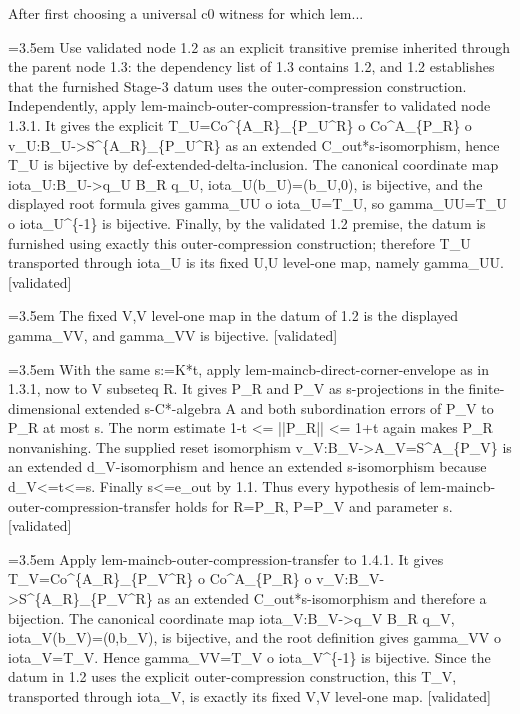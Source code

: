 \documentclass{article}
\newcommand{\step}[1]{\par\noindent\hangindent=3.5em\hangafter=1%
  \makebox[3.5em][l]{\textbf{#1.}}}
\newcommand{\steptag}[1]{\hfill{\small\textsf{[#1]}}}
\begin{document}
\begin{proofbox}{After first choosing a universal c0 witness for which lem...}
\step{1.3.2} Use validated node 1.2 as an explicit transitive premise inherited through the parent node 1.3: the dependency list of 1.3 contains 1.2, and 1.2 establishes that the furnished Stage-3 datum uses the outer-compression construction. Independently, apply lem-maincb-outer-compression-transfer to validated node 1.3.1. It gives the explicit T\_U=Co\textasciicircum{}\{A\_R\}\_\{P\_U\textasciicircum{}R\} o Co\textasciicircum{}A\_\{P\_R\} o v\_U:B\_U->S\textasciicircum{}\{A\_R\}\_\{P\_U\textasciicircum{}R\} as an extended C\_out*s-isomorphism, hence T\_U is bijective by def-extended-delta-inclusion. The canonical coordinate map iota\_U:B\_U->q\_U B\_R q\_U, iota\_U(b\_U)=(b\_U,0), is bijective, and the displayed root formula gives gamma\_UU o iota\_U=T\_U, so gamma\_UU=T\_U o iota\_U\textasciicircum{}\{-1\} is bijective. Finally, by the validated 1.2 premise, the datum is furnished using exactly this outer-compression construction; therefore T\_U transported through iota\_U is its fixed U,U level-one map, namely gamma\_UU. \steptag{validated} \\[4pt]
\step{1.4} The fixed V,V level-one map in the datum of 1.2 is the displayed gamma\_VV, and gamma\_VV is bijective. \steptag{validated} \\[6pt]
\step{1.4.1} With the same s:=K*t, apply lem-maincb-direct-corner-envelope as in 1.3.1, now to V subseteq R. It gives P\_R and P\_V as s-projections in the finite-dimensional extended s-C*-algebra A and both subordination errors of P\_V to P\_R at most s. The norm estimate 1-t <= ||P\_R|| <= 1+t again makes P\_R nonvanishing. The supplied reset isomorphism v\_V:B\_V->A\_V=S\textasciicircum{}A\_\{P\_V\} is an extended d\_V-isomorphism and hence an extended s-isomorphism because d\_V<=t<=s. Finally s<=e\_out by 1.1. Thus every hypothesis of lem-maincb-outer-compression-transfer holds for R=P\_R, P=P\_V and parameter s. \steptag{validated} \\[4pt]
\step{1.4.2} Apply lem-maincb-outer-compression-transfer to 1.4.1. It gives T\_V=Co\textasciicircum{}\{A\_R\}\_\{P\_V\textasciicircum{}R\} o Co\textasciicircum{}A\_\{P\_R\} o v\_V:B\_V->S\textasciicircum{}\{A\_R\}\_\{P\_V\textasciicircum{}R\} as an extended C\_out*s-isomorphism and therefore a bijection. The canonical coordinate map iota\_V:B\_V->q\_V B\_R q\_V, iota\_V(b\_V)=(0,b\_V), is bijective, and the root definition gives gamma\_VV o iota\_V=T\_V. Hence gamma\_VV=T\_V o iota\_V\textasciicircum{}\{-1\} is bijective. Since the datum in 1.2 uses the explicit outer-compression construction, this T\_V, transported through iota\_V, is exactly its fixed V,V level-one map. \steptag{validated} \\[4pt]

\end{proofbox}
\end{document}
